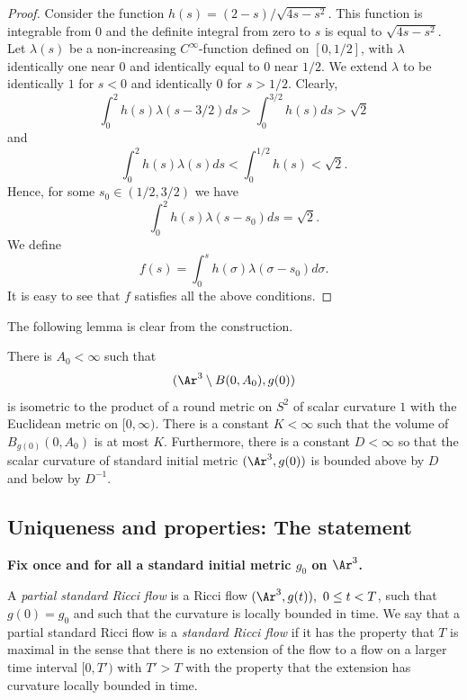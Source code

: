 \begin{proof}
Consider the function $h(s)=(2-s)/\sqrt{4s-s^2}$. This function is
integrable from $0$ and the definite integral from  zero to $s$ is
equal to $\sqrt{4s-s^2}$. Let $\lambda(s)$ be a non-increasing
$C^\infty$-function defined on $[0,1/2]$, with $\lambda$ identically
one near $0$ and identically equal to $0$ near $1/2$. We extend
$\lambda$ to be identically $1$ for $s<0$ and identically $0$ for
$s>1/2$. Clearly,
$$\int_0^2h(s)\lambda(s-3/2)ds>\int_0^{3/2}h(s)ds>\sqrt{2}$$
and $$\int_0^2h(s)\lambda(s)ds<\int_0^{1/2}h(s)<\sqrt{2}.$$ Hence,
for some $s_0\in (1/2,3/2)$ we have
$$\int_0^2h(s)\lambda(s-s_0)ds=\sqrt{2}.$$
We define $$f(s)=\int_0^sh(\sigma)\lambda(\sigma-s_0)d\sigma.$$ It
is easy to see that $f$ satisfies all the above conditions.
\end{proof}

The following lemma is clear from the construction.

\begin{lemma}
\label{lem:standard-initial-metric-asymptotic-bounds}
\label{A_0}
There is $A_0<\infty$ such that
$$(\Ar^3\setminus B(0,A_0),g(0))$$
is isometric to the product of a round metric on $S^2$ of scalar
curvature $1$ with the Euclidean metric on $[0,\infty)$. There is a
constant $K<\infty$ such that the volume of $B_{g(0)}(0,A_0)$ is at
most $K$. Furthermore, there is a constant $D<\infty$ so that the
scalar curvature of standard initial metric $(\Ar^3,g(0))$ is
bounded above by $D$ and below by $D^{-1}$.
\end{lemma}



\subsection{Uniqueness and properties: The statement}

{\bf Fix once and for all a standard initial metric $g_0$ on
$\Ar^3$.}

\begin{definition}
\label{def:standard-ricci-flow}
A {\em partial standard Ricci flow} is a Ricci flow $(\Ar^3,g(t)),\ 0\le t<T$, such
that $g(0)=g_0$ and such that the curvature is locally bounded in
time. We say that a partial standard Ricci flow is a {\em standard
Ricci flow} if it has the property
that $T$ is maximal in the sense that there is no extension of the
flow to a flow on a larger time interval $[0,T')$ with $T'>T$ with
the property that the extension has curvature locally bounded in
time.
\end{definition}

